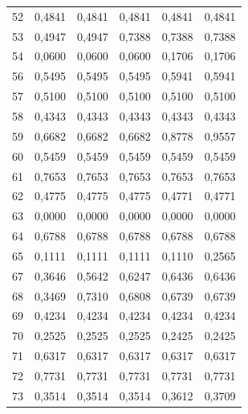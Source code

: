 \begin{center}
\begin{longtable}{c|r|r|r|r|r}
52 & 0,4841 & 0,4841 & 0,4841 & 0,4841 & 0,4841 \\

53 & 0,4947 & 0,4947 & 0,7388 & 0,7388 & 0,7388 \\

54 & 0,0600 & 0,0600 & 0,0600 & 0,1706 & 0,1706 \\

56 & 0,5495 & 0,5495 & 0,5495 & 0,5941 & 0,5941 \\

57 & 0,5100 & 0,5100 & 0,5100 & 0,5100 & 0,5100 \\

58 & 0,4343 & 0,4343 & 0,4343 & 0,4343 & 0,4343 \\

59 & 0,6682 & 0,6682 & 0,6682 & 0,8778 & 0,9557 \\

60 & 0,5459 & 0,5459 & 0,5459 & 0,5459 & 0,5459 \\

61 & 0,7653 & 0,7653 & 0,7653 & 0,7653 & 0,7653 \\

62 & 0,4775 & 0,4775 & 0,4775 & 0,4771 & 0,4771 \\

63 & 0,0000 & 0,0000 & 0,0000 & 0,0000 & 0,0000 \\

64 & 0,6788 & 0,6788 & 0,6788 & 0,6788 & 0,6788 \\

65 & 0,1111 & 0,1111 & 0,1111 & 0,1110 & 0,2565 \\

67 & 0,3646 & 0,5642 & 0,6247 & 0,6436 & 0,6436 \\

68 & 0,3469 & 0,7310 & 0,6808 & 0,6739 & 0,6739 \\

69 & 0,4234 & 0,4234 & 0,4234 & 0,4234 & 0,4234 \\

70 & 0,2525 & 0,2525 & 0,2525 & 0,2425 & 0,2425 \\

71 & 0,6317 & 0,6317 & 0,6317 & 0,6317 & 0,6317 \\

72 & 0,7731 & 0,7731 & 0,7731 & 0,7731 & 0,7731 \\

73 & 0,3514 & 0,3514 & 0,3514 & 0,3612 & 0,3709 \\


\end{longtable}
\end{center}
